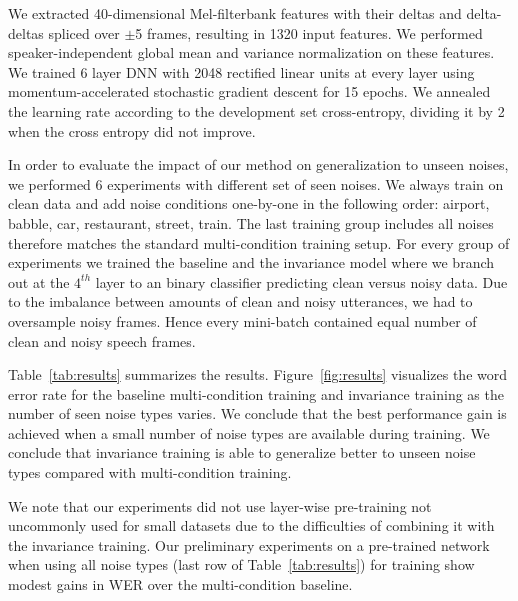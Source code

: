 \documentclass{article}
\begin{document}
We extracted 40-dimensional Mel-filterbank features with their deltas and 
delta-deltas spliced over $\pm$5 frames, resulting in 1320 input 
features. We performed speaker-independent global mean and variance normalization on these features. We trained 6 layer
DNN with 2048 rectified linear units at every layer using momentum-accelerated stochastic gradient descent for 15 epochs. We annealed the learning rate according 
to the development set cross-entropy, dividing it by 2 when the cross entropy did not improve.

In order to evaluate the impact of our method on generalization to unseen noises,
we performed 6 experiments with different set of seen noises. We always train
on clean data and add noise conditions one-by-one in the following order: airport, babble, car, 
restaurant, street, train. The last training group includes all noises therefore matches the
standard multi-condition training setup. For every group of experiments we trained the
baseline and the invariance model where we branch out at the $4^{th}$ layer to an  
binary classifier predicting clean versus noisy data. Due to the imbalance between amounts of clean and
noisy utterances, we had to oversample noisy frames. Hence every mini-batch contained
equal number of clean and noisy speech frames.

Table~\ref{tab:results} summarizes the results. Figure~\ref{fig:results} visualizes the word error rate for the baseline multi-condition training and invariance training as the number of seen noise types varies. We conclude that the best performance
gain is achieved when a small number of noise types are available during training. We conclude that invariance training is able to generalize better to unseen noise types compared with multi-condition training.

We note that our experiments did not use layer-wise pre-training not uncommonly used for small
datasets due to the difficulties of combining it with the invariance training. Our preliminary
experiments on a pre-trained network when using all noise types (last row of Table~\ref{tab:results}) for training show modest gains in WER over the multi-condition baseline. 
\end{document}
